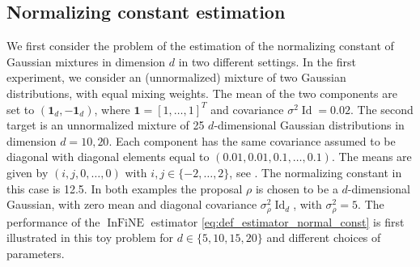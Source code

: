\documentclass{article}
\def\IFIS{\ensuremath{\operatorname{InFiNE}}}
\def\Id{\operatorname{Id}}
\newcommand{\1}{\mathds{1}}
\def\Id{\operatorname{Id}}
\def\Id{\operatorname{Id}}
\def\proposal{\rho}
\begin{document}
\subsection{Normalizing constant estimation}
\label{subsec:estim_constant}
We first consider the problem of the estimation of the normalizing constant of Gaussian mixtures in dimension $d$ in two different settings. In the first experiment, we consider an (unnormalized)  mixture of two Gaussian distributions, with equal mixing weights. The mean of the two components are set to $(\mathbf{1}_d, -\mathbf{1}_d)$, where $\mathbf{1}= [1,\dots,1]^T$ and covariance $\sigma ^2 \Id = 0.02$.
The second target is an unnormalized mixture of 25 $d$-dimensional Gaussian distributions in dimension $d=10,20$. Each component has the same covariance assumed to be diagonal with diagonal elements equal to $(0.01,0.01, 0.1, \ldots, 0.1)$. The means are given by $(i,j,0,\ldots,0)$ with $i,j \in \{-2,\ldots, 2\}$, see .  The normalizing constant in this case is 12.5. In both examples the proposal $\rho$ is chosen to be a $d$-dimensional Gaussian, with zero mean and diagonal covariance $\sigma^2_\proposal \Id_d$, with $\sigma^2_\rho=5$. 
The performance of the $\IFIS$ estimator \eqref{eq:def_estimator_normal_const} is first illustrated in this toy problem for $d\in\{5,10,15,20\}$ and different choices of parameters.
\end{document}

